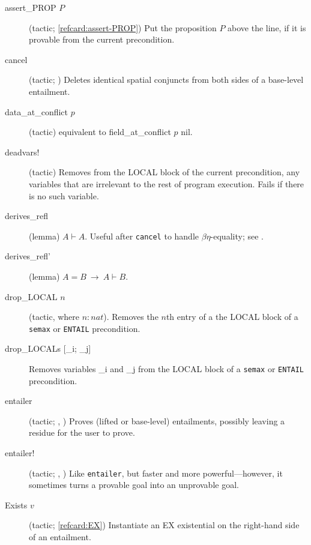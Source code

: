 \documentclass[12pt,fleqn,openany,oneside,showtrims]{memoir}
\begin{document}
\begin{description}
\item[\textsf{assert\_PROP} $P$]
(tactic; \autoref{refcard:assert-PROP})
Put the proposition $P$ above the line, if it is provable
  from the current precondition.

\item[\textsf{cancel}]
(tactic; )
Deletes identical spatial conjuncts
from both sides of a base-level entailment.

\item[\textsf{data\_at\_conflict $p$}]
  (tactic) equivalent to \textsf{field\_at\_conflict $p$ nil}.

\item[\textsf{deadvars!}]
  (tactic) Removes from the LOCAL block of the current precondition, any variables that are irrelevant to the rest of program execution.  Fails if there is no such variable.

\item[\textsf{derives\_refl}]
(lemma)  $A\vdash A$.  Useful after \lstinline{cancel}
  to handle $\beta\eta$-equality; see .

\item[\textsf{derives\_refl'}]
(lemma)  $A=B ~\rightarrow~A\vdash B$.

\item[\textsf{drop\_LOCAL $n$}]
(tactic, where $n:nat$). Removes the $n$th entry of a the LOCAL block of a
\lstinline{semax} or \lstinline{ENTAIL} precondition.

\item[\textsf{drop\_LOCALs [\_i; \_j]}]
Removes variables \textsf{\_i} and \textsf{\_j}
from the LOCAL block of a
\lstinline{semax} or \lstinline{ENTAIL} precondition.

\item[\textsf{entailer}]
(tactic; , )
Proves (lifted or base-level) entailments, possibly leaving a residue
for the user to prove.
\item[\textsf{entailer!}]
(tactic; , )
Like \lstinline{entailer}, but faster and more powerful---however,
it sometimes turns a provable goal into an unprovable goal.

\item[\textsf{Exists} $v$]
(tactic; \autoref{refcard:EX})
  Instantiate an \textsf{EX} existential on the right-hand side of
  an entailment.


\end{description}
\end{document}
